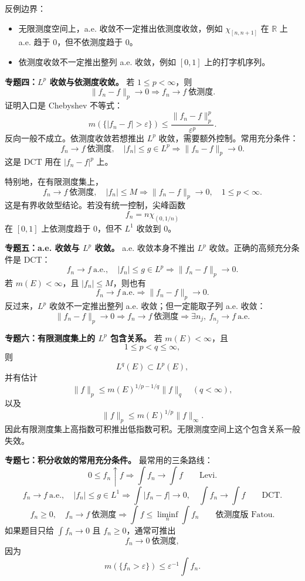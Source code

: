 \documentclass[
UTF8]{ctexart}
\providecommand{\tightlist}{%
\setlength{\itemsep}{0pt}\setlength{\parskip}{0pt}}
\newcommand{\impA}{\hspace{0.4em}{\small\textcolor{impAColor}{\textbf{[A 核心]}}}}
\begin{document}
反例边界：
\begin{itemize}
  \tightlist
\item 无限测度空间上，a.e. 收敛不一定推出依测度收敛，例如 \(\chi_{[n,n+1]}\) 在 \(\mathbb R\) 上 a.e. 趋于 \(0\)，但不依测度趋于 \(0\)。
\item 依测度收敛不一定推出整列 a.e. 收敛，例如 \([0,1]\) 上的打字机序列。
\end{itemize}

\textbf{专题四：\(L^p\) 收敛与依测度收敛。}\impA
若 \(1\le p<\infty\)，则
\[
  \|f_n-f\|_p\to0
  \Longrightarrow
  f_n\to f\ \text{依测度}.
\]
证明入口是 Chebyshev 不等式：
\[
  m(\{|f_n-f|>\varepsilon\})
  \le \frac{\|f_n-f\|_p^p}{\varepsilon^p}.
\]
反向一般不成立。依测度收敛若想推出 \(L^p\) 收敛，需要额外控制。常用充分条件：
\[
  f_n\to f\ \text{依测度},\quad |f_n|\le g\in L^p
  \Longrightarrow
  \|f_n-f\|_p\to0.
\]
这是 DCT 用在 \(|f_n-f|^p\) 上。

特别地，在有限测度集上，
\[
  f_n\to f\ \text{依测度},\quad |f_n|\le M
  \Longrightarrow
  \|f_n-f\|_p\to0,\quad 1\le p<\infty.
\]
这是有界收敛型结论。若没有统一控制，尖峰函数
\[
  f_n=n\chi_{(0,1/n)}
\]
在 \([0,1]\) 上依测度趋于 \(0\)，但不 \(L^1\) 收敛到 \(0\)。

\textbf{专题五：a.e. 收敛与 \(L^p\) 收敛。}\impA
a.e. 收敛本身不推出 \(L^p\) 收敛。正确的高频充分条件是 DCT：
\[
  f_n\to f\ \text{a.e.},\quad |f_n|\le g\in L^p
  \Longrightarrow
  \|f_n-f\|_p\to0.
\]
若 \(m(E)<\infty\)，且 \(|f_n|\le M\)，则也有
\[
  f_n\to f\ \text{a.e.}
  \Longrightarrow
  \|f_n-f\|_p\to0.
\]
反过来，\(L^p\) 收敛不一定推出整列 a.e. 收敛；但一定能取子列 a.e. 收敛：
\[
  \|f_n-f\|_p\to0
  \Longrightarrow
  f_n\to f\ \text{依测度}
  \Longrightarrow
  \exists n_j,\ f_{n_j}\to f\ \text{a.e.}
\]

\textbf{专题六：有限测度集上的 \(L^p\) 包含关系。}\impA
若 \(m(E)<\infty\)，且
\[
  1\le p<q\le\infty,
\]
则
\[
  L^q(E)\subset L^p(E),
\]
并有估计
\[
  \|f\|_p\le m(E)^{1/p-1/q}\|f\|_q
  \quad(q<\infty),
\]
以及
\[
  \|f\|_p\le m(E)^{1/p}\|f\|_\infty.
\]
因此有限测度集上高指数可积推出低指数可积。无限测度空间上这个包含关系一般失效。

\textbf{专题七：积分收敛的常用充分条件。}\impA
最常用的三条路线：
\[
  0\le f_n\uparrow f
  \Longrightarrow
  \int f_n\to\int f
  \qquad\text{Levi}.
\]
\[
  f_n\to f\ \text{a.e.},\quad |f_n|\le g\in L^1
  \Longrightarrow
  \int |f_n-f|\to0,\quad \int f_n\to\int f
  \qquad\text{DCT}.
\]
\[
  f_n\ge0,\quad f_n\to f\ \text{依测度}
  \Longrightarrow
  \int f\le \liminf_n\int f_n
  \qquad\text{依测度版 Fatou}.
\]
如果题目只给 \(\int f_n\to0\) 且 \(f_n\ge0\)，通常可推出
\[
  f_n\to0\ \text{依测度},
\]
因为
\[
  m(\{f_n>\varepsilon\})\le \varepsilon^{-1}\int f_n.
\]
\end{document}

